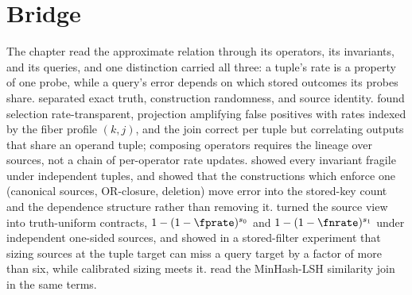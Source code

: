 %

\section{Bridge}
\label{sec:ch12-bridge}

The chapter read the approximate relation through its operators, its invariants,
and its queries, and one distinction carried all three: a tuple's rate is a
property of one probe, while a query's error depends on which stored outcomes its
probes share.  separated exact truth, construction
randomness, and source identity.  found selection
rate-transparent, projection amplifying false positives with rates indexed by the
fiber profile $(k, j)$, and the join correct per tuple but correlating outputs that
share an operand tuple; composing operators requires the lineage over sources, not
a chain of per-operator rate updates.  showed every
invariant fragile under independent tuples, and showed that the constructions which
enforce one (canonical sources, OR-closure, deletion) move error into the stored-key
count and the dependence structure rather than removing it.
 turned the source view into truth-uniform contracts,
$1 - (1 - \fprate)^{s_0}$ and $1 - (1 - \fnrate)^{s_1}$ under independent one-sided
sources, and showed in a stored-filter experiment that sizing sources at the tuple
target can miss a query target by a factor of more than six, while calibrated sizing
meets it.  read the MinHash-LSH similarity join in the
same terms.

